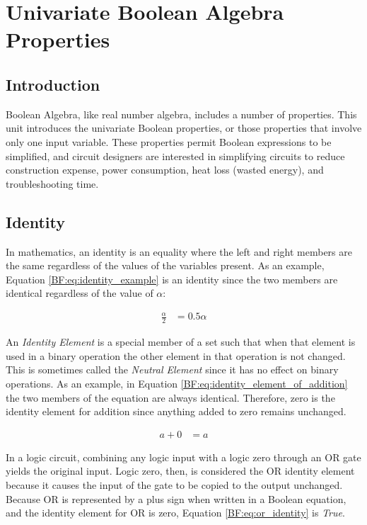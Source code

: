 \section{Univariate Boolean Algebra Properties}
\label{BF:sec:univariate_boolean_algebra_properties}
\subsection{Introduction}
\label{BF:subsec:introduction_to_univariate}

Boolean Algebra, like real number algebra, includes a number of properties. This unit introduces the univariate Boolean properties, or those properties that involve only one input variable. These properties permit Boolean expressions to be simplified, and circuit designers are interested in simplifying circuits to reduce construction expense, power consumption, heat loss (wasted energy), and troubleshooting time.  

\subsection{Identity}
\label{BF:subsec:identity}

In mathematics, an identity is an equality where the left and right members are the same regardless of the values of the variables present. As an example, Equation \ref{BF:eq:identity_example} is an identity since the two members are identical regardless of the value of $ \alpha $:

\begin{align}
  \label{BF:eq:identity_example}
  \frac{\alpha}{2} &= 0.5\alpha
\end{align}

An \emph{Identity Element} is a special member of a set such that when that element is used in a binary operation the other element in that operation is not changed. This is sometimes called the \emph{Neutral Element} since it has no effect on binary operations. As an example, in Equation \ref{BF:eq:identity_element_of_addition} the two members of the equation are always identical. Therefore, zero is the identity element for addition since anything added to zero remains unchanged.

\begin{align}
  \label{BF:eq:identity_element_of_addition}
  a + 0 &= a 
\end{align}

In a logic circuit, combining any logic input with a logic zero through an \textsf{OR}  gate yields the original input. Logic zero, then, is considered the \textsf{OR} identity element because it causes the input of the gate to be copied to the output unchanged. Because \textsf{OR}  is represented by a plus sign when written in a Boolean equation, and the identity element for \textsf{OR}  is zero, Equation \ref{BF:eq:or_identity} is \emph{True}.

